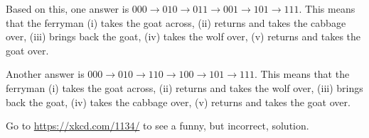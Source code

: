 \begin{exa}
\begin{sol}
Based on this, one answer is  $000\rightarrow 010\rightarrow 011
\rightarrow 001\rightarrow 101 \rightarrow 111.$
This means that
the ferryman (i) takes the goat across, (ii) returns and takes the
cabbage over, (iii) brings back the goat, (iv) takes the wolf over,
(v) returns and takes the goat over. 

Another answer is $000\rightarrow 010\rightarrow 110 \rightarrow
100\rightarrow 101 \rightarrow 111.$
This means that the ferryman
(i) takes the goat across, (ii) returns and takes the wolf over,
(iii) brings back the goat, (iv) takes the cabbage over, (v) returns
and takes the goat over.

Go to \url{https://xkcd.com/1134/} to see a funny, but incorrect, solution.
\end{sol}
\end{exa}


